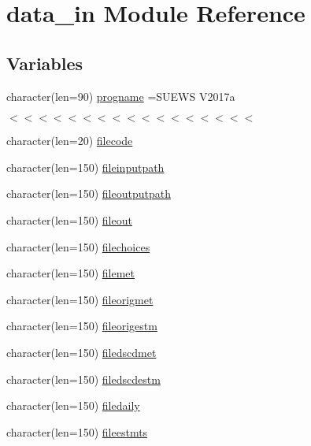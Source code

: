 \hypertarget{namespacedata__in}{}\section{data\+\_\+in Module Reference}
\label{namespacedata__in}
\subsection*{Variables}
\begin{DoxyCompactItemize}
\item 
character(len=90) \hyperlink{namespacedata__in_a7dd6ee68e2bde1c81c0ed1b6a6e9061b}{progname} =\textquotesingle{}S\+U\+E\+WS V2017a\textquotesingle{}
\begin{DoxyCompactList}\small\item\em $<$$<$$<$$<$$<$$<$$<$$<$$<$$<$$<$$<$$<$$<$$<$$<$$<$ \end{DoxyCompactList}\item 
character(len=20) \hyperlink{namespacedata__in_a7f8949b7ebf799e7223eae9fd01a7749}{filecode}
\item 
character(len=150) \hyperlink{namespacedata__in_a67f60bb1f8edd3c6be5380ab655fe7f1}{fileinputpath}
\item 
character(len=150) \hyperlink{namespacedata__in_a62ca2dcc9ca96142df62a94056f96391}{fileoutputpath}
\item 
character(len=150) \hyperlink{namespacedata__in_ac2b450671084fe099a448b9041377812}{fileout}
\item 
character(len=150) \hyperlink{namespacedata__in_a06dcdca28402576db115b411e6a1f090}{filechoices}
\item 
character(len=150) \hyperlink{namespacedata__in_a47dbe76dba82734e5409c2ee5cc0a1d8}{filemet}
\item 
character(len=150) \hyperlink{namespacedata__in_aa954c0fba57d9145cc0c6336009d06bf}{fileorigmet}
\item 
character(len=150) \hyperlink{namespacedata__in_a9cc7b5d1b7fbb824210f4f81d0498bd0}{fileorigestm}
\item 
character(len=150) \hyperlink{namespacedata__in_ad0d0971b802f95d1a4fcc057771aee6b}{filedscdmet}
\item 
character(len=150) \hyperlink{namespacedata__in_aae47ad70ed5c4116cec7838aaaaa302a}{filedscdestm}
\item 
character(len=150) \hyperlink{namespacedata__in_a46e1032d2b5b787e36c022a180204a49}{filedaily}
\item 
character(len=150) \hyperlink{namespacedata__in_a01c2281eb3d97cb6f8fbd7b5e03d33e2}{fileestmts}

\end{DoxyCompactItemize}
